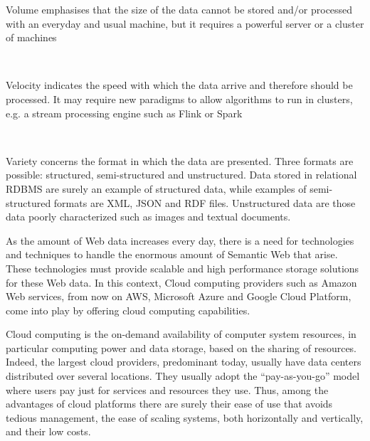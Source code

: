\documentclass[10pt, a4paper]{report}
\begin{document}
\begin{itemize}
	\begin{minipage}{0.92\textwidth}
		\item Volume emphasises that the size of the data cannot be stored and/or processed with an everyday and usual machine, but it requires a powerful server or a cluster of machines \\
	\end{minipage} \\
	\begin{minipage}{0.92\textwidth}
		\item Velocity indicates the speed with which the data arrive and therefore should be processed. It may require new paradigms to allow algorithms to run in clusters, e.g. a stream processing engine such as Flink or Spark \\
	\end{minipage} \\
	\begin{minipage}{0.92\textwidth}
		\item Variety concerns the format in which the data are presented. Three formats are possible: structured, semi-structured and unstructured. Data stored in relational RDBMS are surely an example of structured data, while examples of semi-structured formats are XML, JSON and RDF files. Unstructured data are those data poorly characterized such as images and textual documents.\\
	\end{minipage}
\end{itemize}

As the amount of Web data increases every day, there is a need for technologies and techniques to handle the enormous amount of Semantic Web that arise. These technologies must provide scalable and high performance storage solutions for these Web data. In this context, Cloud computing providers such as Amazon Web services\cite{aws}, from now on AWS, Microsoft Azure\cite{azure} and Google Cloud Platform\cite{google_cloud}, come into play by offering cloud computing capabilities.

Cloud computing is the on-demand availability of computer system resources, in particular computing power and data storage, based on the sharing of resources. Indeed, the largest cloud providers, predominant today, usually have data centers distributed over several locations. They usually adopt the ``pay-as-you-go'' model where users pay just for services and resources they use. Thus, among the advantages of cloud platforms there are surely their ease of use that avoids tedious management, the ease of scaling systems, both horizontally and vertically, and their low costs.
\end{document}

